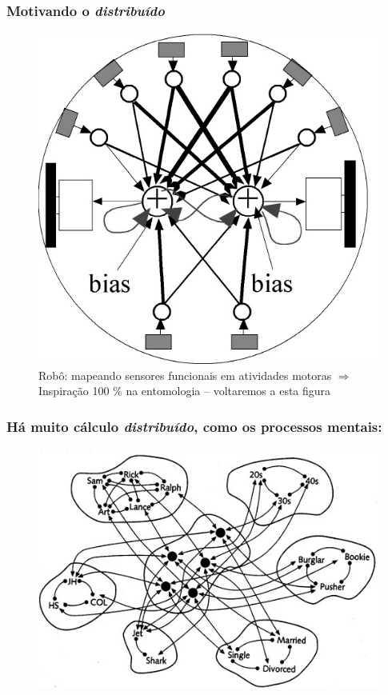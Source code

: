 \begin{frame} %

  \frametitle{Motivando o \textit{distribuído}}
        
\begin{figure}[!ht]
\centering
\includegraphics[height =.5\textheight,width=.4\textwidth]{figuras/DAI_motivation03.jpg}
\caption{Robô: mapeando sensores funcionais em atividades motoras $\Rightarrow$ Inspiração 100 \% na entomologia -- voltaremos a esta figura}
\end{figure}
    
\end{frame}



\begin{frame} %

  \frametitle{Há muito cálculo \textit{distribuído}, como os processos mentais:}
        
\begin{figure}[!ht]
\centering
\includegraphics[height =.6\textheight,width=.8\textwidth]{figuras/processamento_mental_01.jpg}
\end{figure}
    
\end{frame}




